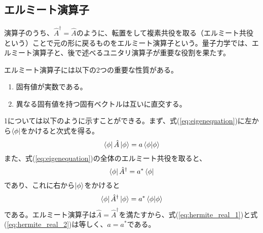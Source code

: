 \subsection{エルミート演算子}
演算子のうち、$\hat A^\dagger = \hat A$のように、転置をして複素共役を取る（エルミート共役という）ことで元の形に戻るものをエルミート演算子という。量子力学では、エルミート演算子と、後で述べるユニタリ演算子が重要な役割を果たす。

エルミート演算子には以下の2つの重要な性質がある。
\begin{enumerate}
	\item 固有値が実数である。
	\item 異なる固有値を持つ固有ベクトルは互いに直交する。
\end{enumerate}

1については以下のように示すことができる。まず、式(\ref{eq:eigenequation})に左から$\bra \phi$をかけると次式を得る。
\begin{equation}
  \bra \phi \hat A \ket \phi = a \braket {\phi|\phi}
  \label{eq:hermite_real_1}
\end{equation}
また、式(\ref{eq:eigenequation})の全体のエルミート共役を取ると、
\begin{equation}
  \bra \phi \hat A^\dagger = a^*\bra \phi
\end{equation}
であり、これに右から$\ket \phi$をかけると
\begin{equation}
  \bra \phi \hat A^\dagger \ket \phi = a^* \braket {\phi|\phi}
  \label{eq:hermite_real_2}
\end{equation}
である。エルミート演算子は$\hat A = \hat A^\dagger$を満たすから、式(\ref{eq:hermite_real_1})と式(\ref{eq:hermite_real_2})は等しく、$a = a^*$である。

